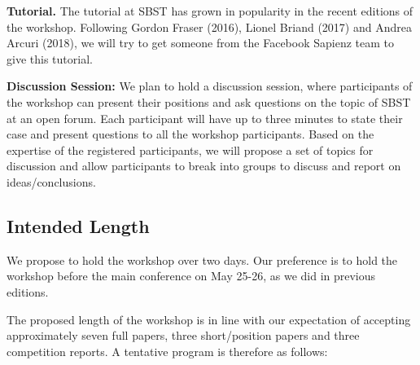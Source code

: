 \documentclass[10pt,conference]{IEEEtran}
\begin{document}
{\bf Tutorial.} The tutorial at SBST has grown in popularity in the
recent editions of the workshop. Following Gordon Fraser (2016),
Lionel Briand (2017) and Andrea Arcuri (2018), we will try to get
someone from the Facebook Sapienz team to give this tutorial.

{\bf Discussion Session:} We plan to hold a discussion session, where
participants of the workshop can present their positions and ask
questions on the topic of SBST at an open forum. Each participant will
have up to three minutes to state their case and present questions to
all the workshop participants. Based on the expertise of the
registered participants, we will propose a set of topics for
discussion and allow participants to break into groups to discuss and
report on ideas/conclusions.

\subsection{Intended Length} We propose to hold the workshop over two
days. Our preference is to hold the workshop before the main
conference on May 25-26, as we did in previous editions.

The proposed length of the workshop is in line with our expectation of
accepting approximately seven full papers, three short/position papers
and three competition reports. A tentative program is therefore as
follows:
\end{document}
